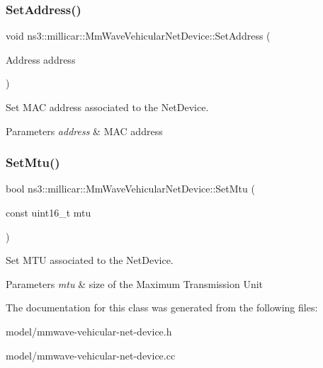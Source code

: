 \subsubsection{\texorpdfstring{Set\+Address()}{SetAddress()}}
{\footnotesize\ttfamily void ns3\+::millicar\+::\+Mm\+Wave\+Vehicular\+Net\+Device\+::\+Set\+Address (\begin{DoxyParamCaption}\item[{Address}]{address }\end{DoxyParamCaption})\hspace{0.3cm}{\ttfamily [virtual]}}



Set M\+AC address associated to the Net\+Device. 


\begin{DoxyParams}{Parameters}
{\em address} & M\+AC address \\
\hline
\end{DoxyParams}
\mbox{\label{classns3_1_1millicar_1_1MmWaveVehicularNetDevice_a5e381e54c479300f0f4180227d810bae}} 
\subsubsection{\texorpdfstring{Set\+Mtu()}{SetMtu()}}
{\footnotesize\ttfamily bool ns3\+::millicar\+::\+Mm\+Wave\+Vehicular\+Net\+Device\+::\+Set\+Mtu (\begin{DoxyParamCaption}\item[{const uint16\+\_\+t}]{mtu }\end{DoxyParamCaption})\hspace{0.3cm}{\ttfamily [virtual]}}



Set M\+TU associated to the Net\+Device. 


\begin{DoxyParams}{Parameters}
{\em mtu} & size of the Maximum Transmission Unit \\
\hline
\end{DoxyParams}


The documentation for this class was generated from the following files\+:\begin{DoxyCompactItemize}
\item 
model/mmwave-\/vehicular-\/net-\/device.\+h\item 
model/mmwave-\/vehicular-\/net-\/device.\+cc\end{DoxyCompactItemize}
